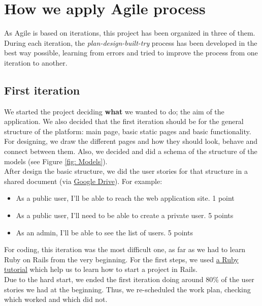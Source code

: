 
\section{How we apply Agile process}
As Agile is based on iterations, this project has been organized in three of them. During each iteration, the \textit{plan-design-built-try} process has been developed in the best way possible, learning from errors and tried to improve the process from one iteration to another.
	\subsection{First iteration}
	We started the project deciding \textbf{what} we wanted to do; the aim of the application. We also decided that the first iteration should be for the general structure of the platform: main page, basic static pages and basic functionality. For designing, we draw the different pages and how they should look, behave and connect between them. Also, we decided and did a schema of the structure of the models (see Figure \ref{fig: Models}).\\
	After design the basic structure, we did the user stories for that structure in a shared document (via \href{https://drive.google.com/drive/my-drive/}{Google Drive}). For example:
	\begin{itemize} \setlength{\itemsep}{-5pt}
	\item As a public user, I’ll be able to reach the web application site. 1 point
	\item As a public user, I’ll need to be able to create a private user. 5 points
	\item As an admin, I’ll be able to see the list of users. 5 points
	\end{itemize}
	For coding, this iteration was the most difficult one, as far as we had to learn Ruby on Rails from the very beginning. For the first steps, we used \href{https://www.railstutorial.org/book/}{a Ruby tutorial} which help us to learn how to start a project in Rails.\\
	Due to the hard start, we ended the first iteration doing around 80\% of the user stories we had at the beginning. Thus, we re-scheduled the work plan, checking which worked and which did not.
